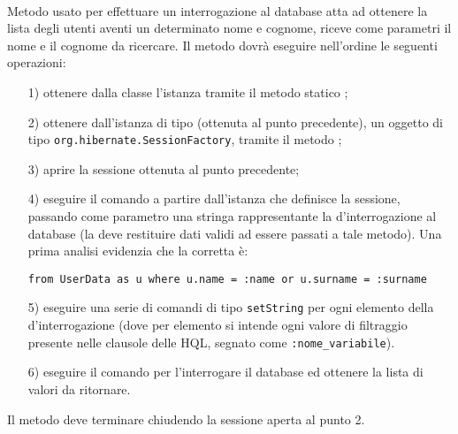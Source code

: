 \begin{description}
	\item{}\\
	Metodo usato per effettuare un interrogazione al database atta ad ottenere la lista degli utenti aventi un determinato nome e cognome, riceve come parametri il nome e il cognome da ricercare. Il metodo dovrà eseguire nell'ordine le seguenti operazioni:
		\begin{itemize}
			\item[1)] ottenere dalla classe  l'istanza tramite il metodo statico ;
			\item[2)] ottenere dall'istanza di tipo (ottenuta al punto precedente), un oggetto di tipo \texttt{org.hibernate.SessionFactory}, tramite il metodo ;
			\item[3)] aprire la sessione ottenuta al punto precedente;
			\item[4)] eseguire il comando  a partire dall'istanza che definisce la sessione, passando come parametro una stringa rappresentante la  d'interrogazione al database (la  deve restituire dati validi ad essere passati a tale metodo). Una prima analisi evidenzia che la  corretta è: 
\begin{verbatim}
from UserData as u where u.name = :name or u.surname = :surname
\end{verbatim}
			\item[5)] eseguire una serie di comandi di tipo \texttt{setString} per ogni elemento della  d'interrogazione (dove per elemento si intende ogni valore di filtraggio presente nelle clausole  delle  HQL, segnato come \texttt{:nome\_variabile}).
			\item[6)] eseguire il comando  per l'interrogare il database ed ottenere la lista di valori da ritornare.
		\end{itemize}
		
Il metodo deve terminare chiudendo la sessione aperta al punto 2.
	

\end{description}
